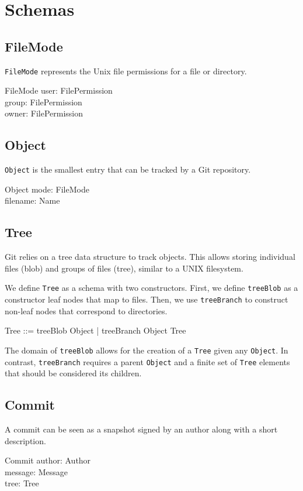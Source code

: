 \section{Schemas}

\subsection{FileMode}

\texttt{FileMode} represents the Unix file permissions for a file or directory.

\begin{schema}{FileMode}
  user: FilePermission \\
  group: FilePermission \\
  owner: FilePermission
\end{schema}

\subsection{Object}

\texttt{Object} is the smallest entry that can be tracked by a Git repository.

\begin{schema}{Object}
  mode: FileMode \\
	filename: Name
\end{schema}

\subsection{Tree}

Git relies on a tree data structure to track objects. This allows storing
individual files (blob) and groups of files (tree), similar to a UNIX
filesystem.

We define \texttt{Tree} as a schema with two constructors. First, we define
\texttt{treeBlob} as a constructor leaf nodes that map to files. Then, we use
\texttt{treeBranch} to construct non-leaf nodes that correspond to directories.

\begin{zed}
  Tree ::= treeBlob \ldata Object \rdata | treeBranch \ldata Object \cross \finset Tree \rdata
\end{zed}

The domain of \texttt{treeBlob} allows for the creation of a \texttt{Tree} given
any \texttt{Object}.  In contrast, \texttt{treeBranch} requires a parent
\texttt{Object} and a finite set of \texttt{Tree} elements that should be
considered its children.

\subsection{Commit}

A commit can be seen as a snapshot signed by an author along with a short
description.

\begin{schema}{Commit}
	author: Author \\
	message: Message \\
	tree: Tree
\end{schema}

